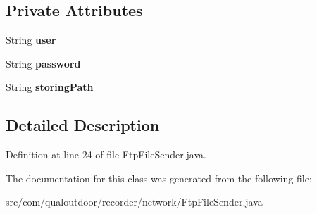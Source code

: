 \subsection*{Private Attributes}
\begin{DoxyCompactItemize}
\item 
\hypertarget{classcom_1_1qualoutdoor_1_1recorder_1_1network_1_1FtpFileSender_af9dc6da501bf104a3e16a1cae4589970}{String {\bfseries user}}\label{classcom_1_1qualoutdoor_1_1recorder_1_1network_1_1FtpFileSender_af9dc6da501bf104a3e16a1cae4589970}

\item 
\hypertarget{classcom_1_1qualoutdoor_1_1recorder_1_1network_1_1FtpFileSender_a22393ab2e452e1881b99214c52fd4405}{String {\bfseries password}}\label{classcom_1_1qualoutdoor_1_1recorder_1_1network_1_1FtpFileSender_a22393ab2e452e1881b99214c52fd4405}

\item 
\hypertarget{classcom_1_1qualoutdoor_1_1recorder_1_1network_1_1FtpFileSender_a226fb2a10a8c0d1d6751f3c619f7d8e5}{String {\bfseries storing\-Path}}\label{classcom_1_1qualoutdoor_1_1recorder_1_1network_1_1FtpFileSender_a226fb2a10a8c0d1d6751f3c619f7d8e5}

\end{DoxyCompactItemize}


\subsection{Detailed Description}


Definition at line 24 of file Ftp\-File\-Sender.\-java.



The documentation for this class was generated from the following file\-:\begin{DoxyCompactItemize}
\item 
src/com/qualoutdoor/recorder/network/Ftp\-File\-Sender.\-java\end{DoxyCompactItemize}
